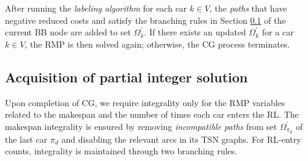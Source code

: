 \documentclass[12pt]{article}
\begin{document}
After running the \textit{labeling algorithm} for each car $k\in V$, the \textit{paths} that have negative reduced costs and satisfy the branching rules in Section \ref{sec4-4} of the current BB node are added to set $\Omega^{\prime}_k$. If there exists an updated $\Omega^{\prime}_k$ for a car $k\in V$, the RMP is then solved again; otherwise, the CG process terminates.





\subsection{Acquisition of partial integer solution}\label{sec4-4}
Upon completion of CG, we require integrality only for the RMP variables related to the makespan and the number of times each car enters the RL. The makespan integrality is ensured by removing \textit{incompatible paths} from set $\Omega^{\prime}_{\pi_d}$ of the last car $\pi_d$ and disabling the relevant arcs in its TSN graphs. For RL-entry counts, integrality is maintained through two branching rules.

\end{document}
